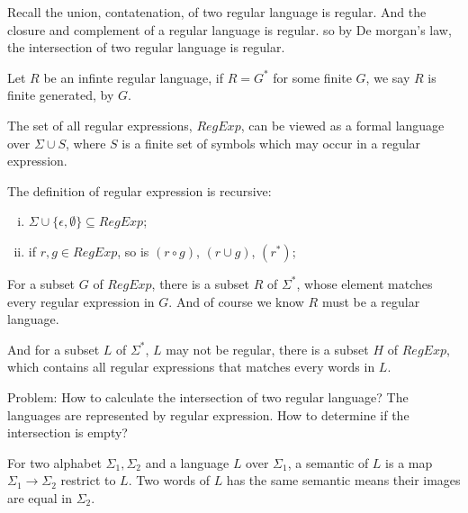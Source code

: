 \documentclass{article}
\begin{document}

Recall the union, contatenation, of two regular language is regular.
And the closure and complement of a regular language is regular.
so by De morgan's law, the intersection of two regular language is regular.

Let $R$ be an infinte regular language, if $R = G^\ast$ for some finite $G$, 
we say $R$ is finite generated, by $G$.

The set of all regular expressions, $RegExp$, can be viewed as a formal 
language over $\Sigma \cup S$, where $S$ is a finite set of 
symbols which may occur in a regular expression.

The definition of regular expression is recursive: 
\begin{enumerate}[i).]
\item $\Sigma \cup \{\epsilon, \emptyset\} \subseteq RegExp$;
\item if $r, g \in RegExp$, so is $(r \circ g)$, $(r \cup g)$, $(r^\ast)$;
\end{enumerate}


For a subset $G$ of $RegExp$, there is a subset $R$ of $\Sigma^\ast$, 
whose element matches every regular expression in $G$. 
And of course we know $R$ must be a regular language.

And for a subset $L$ of $\Sigma^\ast$, $L$ may not be regular, 
there is a subset $H$ of $RegExp$,
which contains all regular expressions that matches every words in $L$.

Problem: How to calculate the intersection of two regular language?
The languages are represented by regular expression.
How to determine if the intersection is empty?

For two alphabet $\Sigma_1, \Sigma_2$ and a language $L$ over $\Sigma_1$, 
a semantic of $L$ is a map $\Sigma_1 \to \Sigma_2$ restrict to $L$.
Two words of $L$ has the same semantic means their images are equal in $\Sigma_2$.
\end{document}
